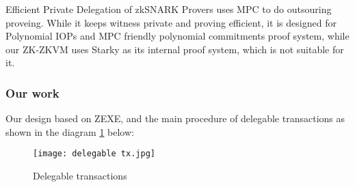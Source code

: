 Efficient Private Delegation of zkSNARK Provers \cite{website:epdzp} uses MPC to do outsouring proveing. While it keeps witness private and proving efficient, it is designed for Polynomial IOPs and MPC friendly polynomial commitments proof system, while our ZK-ZKVM uses Starky as its internal proof system, which is not suitable for it.

\subsubsection{Our work}

Our design based on ZEXE, and the main procedure of delegable transactions as shown in the diagram \ref{fig:delegable_tx} below:

\begin{figure}[!ht]
    \centering
    \texttt{[image: delegable tx.jpg]}
    \caption{Delegable transactions}
    \label{fig:delegable_tx}
\end{figure}